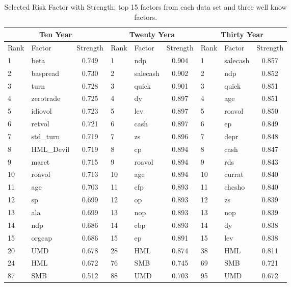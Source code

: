 \begin{table}[]
	\centering
	\caption{Selected Risk Factor with Strength: top 15 factors from each data set and three well know factors.}
	\begin{tabular}{llc|llc|llc}
		\hline
		\multicolumn{3}{c|}{Ten Year} & \multicolumn{3}{c|}{Twenty Yera} & \multicolumn{3}{c}{Thirty Year} \\ \hline
		Rank & Factor     & Strength & Rank   & Factor     & Strength   & Rank   & Factor     & Strength   \\ \hline
		1    & beta       & 0.749    & 1      & ndp        & 0.904      & 1      & salecash   & 0.857      \\
		2    & baspread   & 0.730    & 2      & salecash   & 0.902      & 2      & ndp        & 0.852      \\
		3    & turn       & 0.728    & 3      & quick      & 0.901      & 3      & quick      & 0.851      \\
		4    & zerotrade  & 0.725    & 4      & dy         & 0.897      & 4      & age        & 0.851      \\
		5    & idiovol    & 0.723    & 5      & lev        & 0.897      & 5      & roavol     & 0.850      \\
		6    & retvol     & 0.721    & 6      & cash       & 0.897      & 6      & ep         & 0.849      \\
		7    & std\_turn  & 0.719    & 7      & zs         & 0.896      & 7      & depr       & 0.848      \\
		8    & HML\_Devil & 0.719    & 8      & cp         & 0.894      & 8      & cash       & 0.847      \\
		9    & maret      & 0.715    & 9      & roavol     & 0.894      & 9      & rds        & 0.843      \\
		10   & roavol     & 0.713    & 10     & age        & 0.894      & 10     & currat     & 0.840      \\
		11 & age  & 0.703 &11 & cfp  & 0.893 & 11 & chcsho  & 0.840 \\ 
		12 & sp  & 0.699&12 & op& 0.893&12 & zs & 0.839 \\ 
		13 & ala & 0.699&13 & nop  & 0.893&13 & nop & 0.839 \\ 
		14 & ndp & 0.686&14 & ebp  & 0.893&14 & dy  & 0.838 \\ 
		15 & orgcap & 0.686&15 & ep  & 0.891 &15& lev & 0.838 \\ 
		20   & UMD        & 0.678    & 28     & HML        & 0.874      & 38     & HML        & 0.811      \\
		24   & HML        & 0.672    & 76     & SMB        & 0.745      & 69     & SMB        & 0.721      \\
		87   & SMB        & 0.512    & 88     & UMD        & 0.703      & 95     & UMD        & 0.672      \\ \hline
	\end{tabular}
\end{table}
